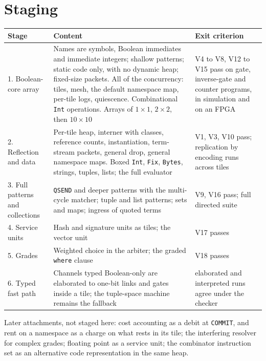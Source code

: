 \documentclass[10.5pt,a4paper]{extarticle}
\newcommand{\kw}[1]{\texttt{#1}}
\theoremstyle{definition}
\theoremstyle{remark}
\begin{document}
\section{Staging}\label{sec:staging}

\noindent
\begin{tabularx}{\textwidth}{@{}l X X@{}}
\toprule
Stage & Content & Exit criterion\\
\midrule
1. Boolean-core array & Names are symbols, Boolean immediates and immediate
  integers; shallow patterns; static code only, with no dynamic heap;
  fixed-size packets. All of the concurrency: tiles, mesh, the default
  namespace map, per-tile logs, quiescence. Combinational \kw{Int}
  operations. Arrays of $1 \times 1$, $2 \times 2$, then $10 \times 10$
  & V4 to V8, V12 to V15 pass on gate, inverse-gate and counter programs, in
    simulation and on an FPGA\\
2. Reflection and data & Per-tile heap, interner with classes, reference
  counts, instantiation, term-stream packets, general drop, general
  namespace maps. Boxed \kw{Int}, \kw{Fix}, \kw{Bytes}, strings, tuples,
  lists; the full evaluator
  & V1, V3, V10 pass; replication by encoding runs across tiles\\
3. Full patterns and collections & \kw{QSEND} and deeper patterns with the
  multi-cycle matcher; tuple and list patterns; sets and maps; ingress of
  quoted terms & V9, V16 pass; full directed suite\\
4. Service units & Hash and signature units as tiles; the vector unit
  & V17 passes\\
5. Grades & Weighted choice in the arbiter; the graded \kw{where} clause
  & V18 passes\\
6. Typed fast path & Channels typed Boolean-only are elaborated to one-bit
  links and gates inside a tile; the tuple-space machine remains the fallback
  & elaborated and interpreted runs agree under the checker\\
\bottomrule
\end{tabularx}

\medskip\noindent
Later attachments, not staged here: cost accounting as a debit at
\kw{COMMIT}, and rent on a namespace as a charge on what rests in its tile;
the interfering resolver for complex grades; floating point as a service
unit; the combinator instruction set as an alternative code representation
in the same heap.

\end{document}
